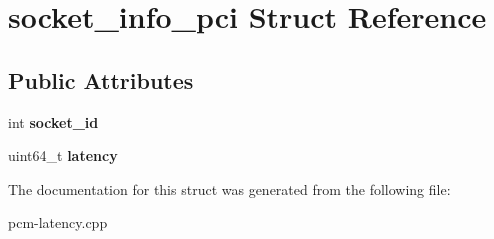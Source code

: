\section{socket\+\_\+info\+\_\+pci Struct Reference}
\label{structsocket__info__pci}
\subsection*{Public Attributes}
\begin{DoxyCompactItemize}
\item 
\mbox{\label{structsocket__info__pci_a24b03fc0931b33dfb8234299084e74f5}} 
int {\bfseries socket\+\_\+id}
\item 
\mbox{\label{structsocket__info__pci_a54c1d2f1cae45696bf407acd48003d5d}} 
uint64\+\_\+t {\bfseries latency}
\end{DoxyCompactItemize}


The documentation for this struct was generated from the following file\+:\begin{DoxyCompactItemize}
\item 
pcm-\/latency.\+cpp\end{DoxyCompactItemize}
